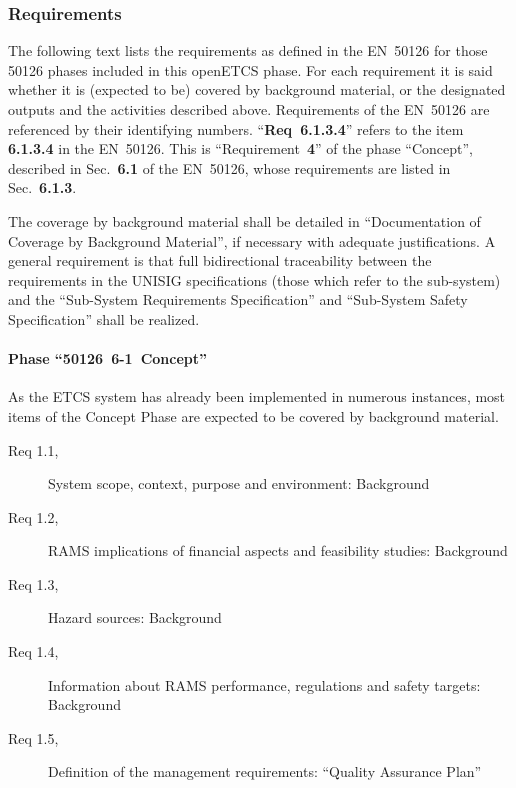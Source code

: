 \documentclass{template/openetcs_article}
\begin{document}
\subsubsection{Requirements}
\label{sec:1-requirements}

The following text lists the requirements as defined in the EN~50126
for those 50126 phases included in this openETCS phase. For each
requirement it is said whether it is (expected to be) covered by
background material, or the designated outputs and the activities
described above. Requirements of the EN~50126 are referenced by their
identifying numbers. ``\textbf{Req~6.1.3.4}'' refers to the item
\textbf{6.1.3.4} in the EN~50126. This is ``Requirement~\textbf{4}''
of the phase ``Concept'', described in Sec.~\textbf{6.1} of the
EN~50126, whose requirements are listed in Sec.~\textbf{6.1.3}.



The coverage by background material shall be detailed in
``Documentation of Coverage by Background Material'', if necessary
with adequate justifications. A general requirement is that full
bidirectional traceability between the requirements in the UNISIG
specifications (those which refer to the sub-system) and the
``Sub-System Requirements Specification'' and ``Sub-System Safety
Specification'' shall be realized.

\paragraph{Phase ``50126~6-1~Concept''}

As the ETCS system has already been implemented in numerous instances,
most items of the Concept Phase are expected to be covered by
background material. 
%
\begin{description}
\item[Req 1.1, {\cite[6.1.3.1]{EN50126:1999}}] System scope, context,
  purpose and environment: Background
\item[Req 1.2, {\cite[6.1.3.2]{EN50126:1999}}] RAMS implications of
  financial aspects and feasibility studies: Background
\item[Req 1.3, {\cite[6.1.3.3]{EN50126:1999}}] Hazard sources:
  Background
\item[Req 1.4, {\cite[6.1.3.4]{EN50126:1999}}] Information about RAMS
  performance, regulations and safety targets: Background
\item[Req 1.5, {\cite[6.1.3.5]{EN50126:1999}}] Definition of the
  management requirements: ``Quality Assurance Plan''
\end{description}
\end{document}
